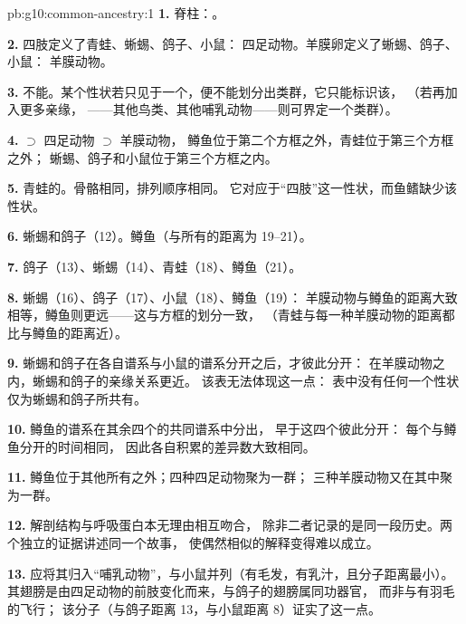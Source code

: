 \begin{solution}{pb:g10:common-ancestry:1}
\textbf{1.} 脊柱：。

\textbf{2.} 四肢定义了青蛙、蜥蜴、鸽子、小鼠：
四足动物。羊膜卵定义了蜥蜴、鸽子、小鼠：
羊膜动物。

\textbf{3.} 不能。某个性状若只见于一个，便不能划分出类群，它只能标识该，
（若再加入更多亲缘，
——其他鸟类、其他哺乳动物——则可界定一个类群）。

\textbf{4.}  $\supset$ 四足动物 $\supset$ 羊膜动物，
鳟鱼位于第二个方框之外，青蛙位于第三个方框之外；
蜥蜴、鸽子和小鼠位于第三个方框之内。

\textbf{5.} 青蛙的。骨骼相同，排列顺序相同。
它对应于“四肢”这一性状，而鱼鳍缺少该性状。

\textbf{6.} 蜥蜴和鸽子（12）。鳟鱼（与所有的距离为 19--21）。

\textbf{7.} 鸽子（13）、蜥蜴（14）、青蛙（18）、鳟鱼（21）。

\textbf{8.} 蜥蜴（16）、鸽子（17）、小鼠（18）、鳟鱼（19）：
羊膜动物与鳟鱼的距离大致相等，鳟鱼则更远——这与方框的划分一致，
（青蛙与每一种羊膜动物的距离都比与鳟鱼的距离近）。

\textbf{9.} 蜥蜴和鸽子在各自谱系与小鼠的谱系分开之后，才彼此分开：
在羊膜动物之内，蜥蜴和鸽子的亲缘关系更近。
该表无法体现这一点：
表中没有任何一个性状仅为蜥蜴和鸽子所共有。

\textbf{10.} 鳟鱼的谱系在其余四个的共同谱系中分出，
早于这四个彼此分开：
每个与鳟鱼分开的时间相同，
因此各自积累的差异数大致相同。

\textbf{11.} 鳟鱼位于其他所有之外；四种四足动物聚为一群；
三种羊膜动物又在其中聚为一群。

\textbf{12.} 解剖结构与呼吸蛋白本无理由相互吻合，
除非二者记录的是同一段历史。两个独立的证据讲述同一个故事，
使偶然相似的解释变得难以成立。

\textbf{13.} 应将其归入“哺乳动物”，与小鼠并列（有毛发，有乳汁，且分子距离最小）。
其翅膀是由四足动物的前肢变化而来，与鸽子的翅膀属同功器官，
而非与有羽毛的飞行；
该分子（与鸽子距离 13，与小鼠距离 8）证实了这一点。


\end{solution}
